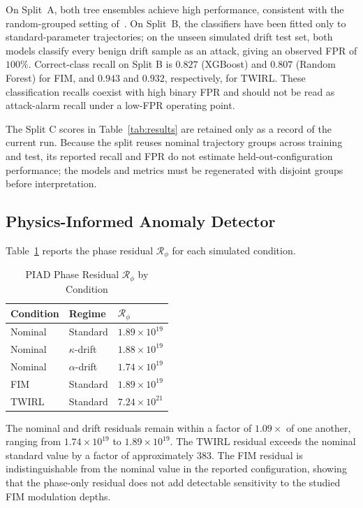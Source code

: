 \documentclass[journal,twocolumn]{IEEEtran}
\newcommand{\Rphase}{\mathcal{R}_{\!\phi}}
\newcommand{\kap}{\kappa}
\begin{document}
On Split~A, both tree ensembles achieve high performance, consistent with the
random-grouped setting of~\cite{basepaper}. On Split~B, the classifiers have been
fitted only to standard-parameter trajectories; on the unseen simulated drift test
set, both models classify every benign drift sample as an attack, giving an observed
FPR of $100\%$. Correct-class recall on Split B is $0.827$ (XGBoost) and $0.807$
(Random Forest) for FIM, and $0.943$ and $0.932$, respectively, for TWIRL. These
classification recalls coexist with high binary FPR and should not be read as
attack-alarm recall under a low-FPR operating point.

The Split C scores in Table~\ref{tab:results} are retained only as a record of the
current run. Because the split reuses nominal trajectory groups across training and
test, its reported recall and FPR do not estimate held-out-configuration performance;
the models and metrics must be regenerated with disjoint groups before interpretation.

\subsection{Physics-Informed Anomaly Detector}

Table~\ref{tab:residuals} reports the phase residual $\Rphase$ for each simulated
condition.

\begin{table}[t]
  \centering
  \caption{PIAD Phase Residual $\Rphase$ by Condition}
  \label{tab:residuals}
  \renewcommand{\arraystretch}{1.15}
  \begin{tabular}{@{}lll@{}}
    \toprule
    Condition & Regime & $\Rphase$ \\
    \midrule
    Nominal & Standard      & $1.89 \times 10^{19}$ \\
    Nominal & $\kap$-drift  & $1.88 \times 10^{19}$ \\
    Nominal & $\alpha$-drift & $1.74 \times 10^{19}$ \\
    FIM     & Standard      & $1.89 \times 10^{19}$ \\
    TWIRL   & Standard      & $7.24 \times 10^{21}$ \\
    \bottomrule
  \end{tabular}
\end{table}

The nominal and drift residuals remain within a factor of $1.09\times$ of one
another, ranging from $1.74\times10^{19}$ to $1.89\times10^{19}$. The TWIRL residual
exceeds the nominal standard value by a factor of approximately $383$. The FIM residual
is indistinguishable from the nominal value in the reported configuration, showing
that the phase-only residual does not add detectable sensitivity to the studied FIM
modulation depths.
\end{document}
